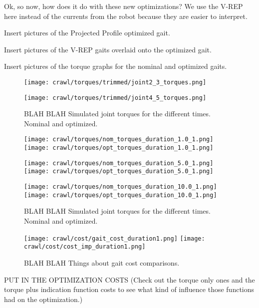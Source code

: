 Ok, so now, how does it do with these new optimizations?
We use the V-REP here instead of the currents from the robot because they are easier to interpret.

Insert pictures of the Projected Profile optimized gait.

Insert pictures of the V-REP gaits overlaid onto the
optimized gait.

Insert pictures of the torque graphs for the nominal and optimized gaits.

\begin{figure}
  \centerline{
    \texttt{[image: crawl/torques/trimmed/joint2\_3\_torques.png]}
  }
  \centerline{
    \texttt{[image: crawl/torques/trimmed/joint4\_5\_torques.png]}
  }
  \caption{BLAH BLAH Simulated joint torques for the different times. Nominal and optimized.}
  \label{fig:vrep_joint_torques_by_joint1}
\end{figure}

\begin{figure}
  \centerline{
    \texttt{[image: crawl/torques/nom\_torques\_duration\_1.0\_1.png]}
    \texttt{[image: crawl/torques/opt\_torques\_duration\_1.0\_1.png]}
  }
  \centerline{
    \texttt{[image: crawl/torques/nom\_torques\_duration\_5.0\_1.png]}
    \texttt{[image: crawl/torques/opt\_torques\_duration\_5.0\_1.png]}
  }
  \centerline{
    \texttt{[image: crawl/torques/nom\_torques\_duration\_10.0\_1.png]}
    \texttt{[image: crawl/torques/opt\_torques\_duration\_10.0\_1.png]}
  }
  \caption{BLAH BLAH Simulated joint torques for the different times. Nominal and optimized.}
  \label{fig:vrep_joint_torques_by_duration1}
\end{figure}

\begin{figure}
  \texttt{[image: crawl/cost/gait\_cost\_duration1.png]}
  \texttt{[image: crawl/cost/cost\_imp\_duration1.png]}
  \caption{BLAH BLAH Things about gait cost comparisons.}
  \label{fig:cost_duration1}
\end{figure}




PUT IN THE OPTIMIZATION COSTS (Check out the torque only ones and the torque plus indication
function costs to see what kind of influence those functions had on the optimization.)


